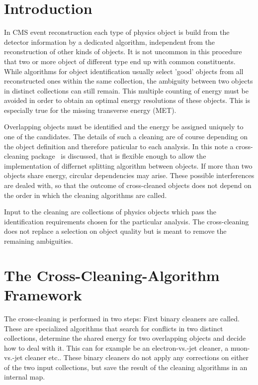 \documentclass{cmspaper}
\begin{document}
\setcounter{page}{2}%


\newpage
\section{Introduction}

In CMS event reconstruction each type of physics object is build from the
detector information by a dedicated algorithm, independent from the
reconstruction of other kinds of objects. It is not uncommon in this procedure
that two or more object of different type end up with common constituents.
While algorithms for object identification usually select 'good' objects
from all reconstructed ones within the same collection, the ambiguity between two
objects in distinct collections can still remain. This multiple counting of
energy must be avoided in order to obtain an optimal energy resolutions of these
objects. This is especially true for the missing transverse energy (MET).

Overlapping objects must be identified and the energy be assigned uniquely to
one of the candidates. The details of such a cleaning are of course depending on
the object definition and therefore paticular to each analysis.  In this note a
cross-cleaning package~\cite{package} is discussed, that is flexible enough to
allow the implementation of differnet splitting algorithm between objects.
If more than two objects share energy, circular dependencies may arise. These
possible interferences are dealed with, so that the outcome of cross-cleaned
objects does not depend on the order in which the cleaning algorithms are
called.

Input to the cleaning are collections of physics objects which pass the
identification requirements chosen for the particular analysis. The
cross-cleaning does not replace a selection on object quality but is meant to
remove the remaining ambiguities.


\section{The Cross-Cleaning-Algorithm Framework}
The cross-cleaning is performed in two steps: First binary cleaners are called.
These are specialized algorithms that search for conflicts in two distinct
collections, determine the shared energy for two overlapping objects and decide
how to deal with it. This can for example be an electron-vs.-jet cleaner, a
muon-vs.-jet cleaner etc.. These binary cleaners do not apply any corrections
on either of the two input collections, but save the result of the cleaning
algorithms in an internal map.
\end{document}
